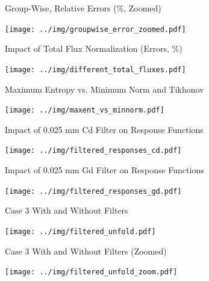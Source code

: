 \documentclass[fleqn]{beamer}
\begin{document}
    \begin{frame}{Group-Wise, Relative Errors (\%, Zoomed)}
         \begin{center}
             \texttt{[image: ../img/groupwise\_error\_zoomed.pdf]}
         \end{center}
    \end{frame}
    
    \begin{frame}{Impact of Total Flux Normalization (Errors, \%)}
         \begin{center}
             \texttt{[image: ../img/different\_total\_fluxes.pdf]}
         \end{center}
    \end{frame}

    \begin{frame}{Maximum Entropy vs. Minimum Norm and Tikhonov}
         \begin{center}
             \texttt{[image: ../img/maxent\_vs\_minnorm.pdf]}
         \end{center}
    \end{frame}  
    
    \begin{frame}{Impact of 0.025 mm Cd Filter on Response Functions}
         \begin{center}
             \texttt{[image: ../img/filtered\_responses\_cd.pdf]}
         \end{center}
    \end{frame}  
    
    
    \begin{frame}{Impact of 0.025 mm Gd Filter on Response Functions}
         \begin{center}
             \texttt{[image: ../img/filtered\_responses\_gd.pdf]}
         \end{center}
    \end{frame}  
    
    
    \begin{frame}{Case 3 With and Without Filters}
         \begin{center}
             \texttt{[image: ../img/filtered\_unfold.pdf]}
         \end{center}
    \end{frame}  
    
    \begin{frame}{Case 3 With and Without Filters (Zoomed)}
         \begin{center}
             \texttt{[image: ../img/filtered\_unfold\_zoom.pdf]}
         \end{center}
    \end{frame}  
    
\end{document}
